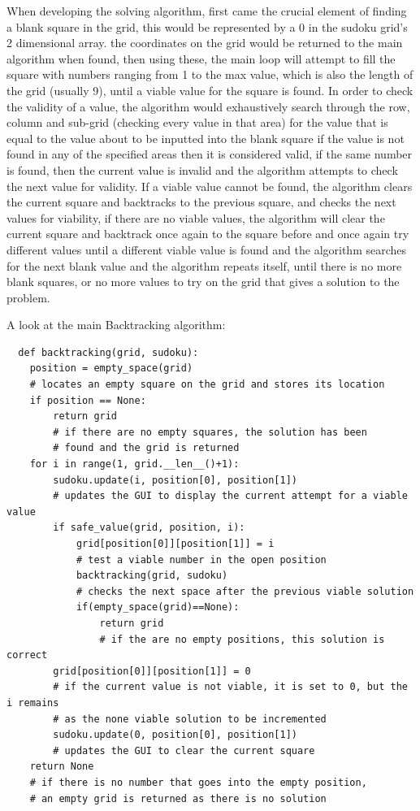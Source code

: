 \documentclass[]{final_report}
\begin{document}
When developing the solving algorithm, first came the crucial element of finding a blank square in the grid, this would be represented by a 0 in the sudoku grid’s 2 dimensional array. the coordinates on the grid would be returned to the main algorithm when found, then using these, the main loop will attempt to fill the square with numbers ranging from 1 to the max value, which is also the length of the grid (usually 9), until a viable value for the square is found. In order to check the validity of a value, the algorithm would exhaustively search through the row, column and sub-grid (checking every value in that area) for the value that is equal to the value about to be inputted into the blank square if the value is not found in any of the specified areas then it is considered valid, if the same number is found, then the current value is invalid and the algorithm attempts to check  the next value for validity. If a viable value cannot be found, the algorithm clears the current square and backtracks to the previous square, and checks the next values for viability, if there are no viable values, the algorithm will clear the current square and backtrack once again to the square before and once again try different values until a different viable value is found and the algorithm searches for the next blank value and the algorithm repeats itself, until there is no more blank squares, or no more values to try on the grid that gives a solution to the problem. 

A look at the main Backtracking algorithm:
\begin{verbatim}
  def backtracking(grid, sudoku):
    position = empty_space(grid)
    # locates an empty square on the grid and stores its location
    if position == None:
        return grid
        # if there are no empty squares, the solution has been 
        # found and the grid is returned
    for i in range(1, grid.__len__()+1):
        sudoku.update(i, position[0], position[1])
        # updates the GUI to display the current attempt for a viable value
        if safe_value(grid, position, i):
            grid[position[0]][position[1]] = i
            # test a viable number in the open position
            backtracking(grid, sudoku)
            # checks the next space after the previous viable solution
            if(empty_space(grid)==None):
                return grid
                # if the are no empty positions, this solution is correct
        grid[position[0]][position[1]] = 0
        # if the current value is not viable, it is set to 0, but the i remains
        # as the none viable solution to be incremented
        sudoku.update(0, position[0], position[1])
        # updates the GUI to clear the current square
    return None
    # if there is no number that goes into the empty position, 
    # an empty grid is returned as there is no solution
\end{verbatim}
\end{document}
